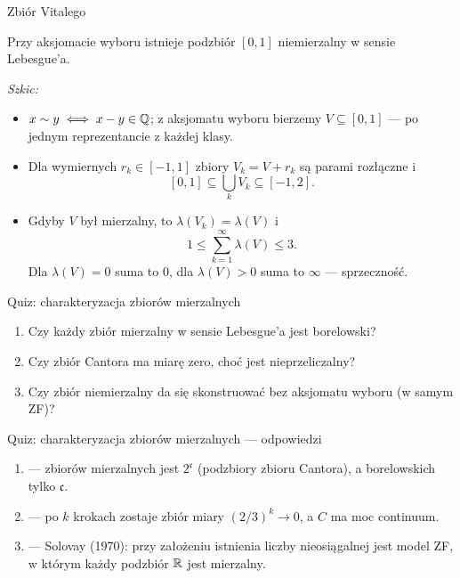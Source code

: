 \documentclass[aspectratio=169,11pt,t,envcountsect,professionalfonts]{beamer}
\begin{document}
\begin{frame}{Zbiór Vitalego}
  \begin{mythm}[Vitali]
    Przy aksjomacie wyboru istnieje podzbiór $[0,1]$ niemierzalny w sensie Lebesgue'a.
  \end{mythm}
  \textit{Szkic:}
  \begin{itemize}
    \item $x \sim y \iff x - y \in \mathbb{Q}$; z aksjomatu wyboru bierzemy $V \subseteq [0,1]$ --- po jednym reprezentancie z każdej klasy.
    \item Dla wymiernych $r_k \in [-1,1]$ zbiory $V_k = V + r_k$ są parami rozłączne i
      \[
        [0,1] \subseteq \bigcup_{k} V_k \subseteq [-1,2].
      \]
    \item Gdyby $V$ był mierzalny, to $\lambda(V_k) = \lambda(V)$ i
      \[
        1 \le \sum_{k=1}^\infty \lambda(V) \le 3.
      \]
      Dla $\lambda(V) = 0$ suma to $0$, dla $\lambda(V) > 0$ suma to $\infty$ --- sprzeczność.
  \end{itemize}
\end{frame}

\begin{frame}{Quiz: charakteryzacja zbiorów mierzalnych}
  \begin{enumerate}
    \item Czy każdy zbiór mierzalny w sensie Lebesgue'a jest borelowski?
    \item Czy zbiór Cantora ma miarę zero, choć jest nieprzeliczalny?
    \item Czy zbiór niemierzalny da się skonstruować bez aksjomatu wyboru (w samym ZF)?
  \end{enumerate}
\end{frame}

\begin{frame}{Quiz: charakteryzacja zbiorów mierzalnych --- odpowiedzi}
  \begin{enumerate}
    \item \NIE{} --- zbiorów mierzalnych jest $2^{\mathfrak{c}}$ (podzbiory zbioru Cantora), a borelowskich tylko $\mathfrak{c}$.
    \item \TAK{} --- po $k$ krokach zostaje zbiór miary $(2/3)^k \to 0$, a $C$ ma moc continuum.
    \item \NIE{} --- Solovay (1970): przy założeniu istnienia liczby nieosiągalnej jest model ZF, w którym każdy podzbiór $\mathbb{R}$ jest mierzalny.
  \end{enumerate}
\end{frame}
\end{document}
